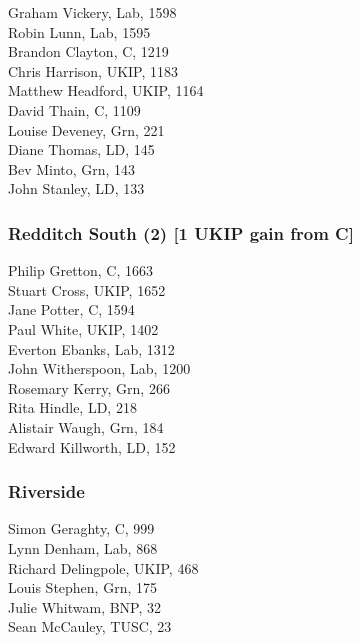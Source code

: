 \documentclass[a4paper,openany,10pt]{book}
\begin{document}


Graham Vickery, Lab, 1598\\
Robin Lunn, Lab, 1595\\
Brandon Clayton, C, 1219\\
Chris Harrison, UKIP, 1183\\
Matthew Headford, UKIP, 1164\\
David Thain, C, 1109\\
Louise Deveney, Grn, 221\\
Diane Thomas, LD, 145\\
Bev Minto, Grn, 143\\
John Stanley, LD, 133\\


\subsubsection*{Redditch South (2) \hspace*{\fill}\nolinebreak[1]%
\enspace\hspace*{\fill}
[1 UKIP gain from C]}



Philip Gretton, C, 1663\\
Stuart Cross, UKIP, 1652\\
Jane Potter, C, 1594\\
Paul White, UKIP, 1402\\
Everton Ebanks, Lab, 1312\\
John Witherspoon, Lab, 1200\\
Rosemary Kerry, Grn, 266\\
Rita Hindle, LD, 218\\
Alistair Waugh, Grn, 184\\
Edward Killworth, LD, 152\\


\subsubsection*{Riverside}



Simon Geraghty, C, 999\\
Lynn Denham, Lab, 868\\
Richard Delingpole, UKIP, 468\\
Louis Stephen, Grn, 175\\
Julie Whitwam, BNP, 32\\
Sean McCauley, TUSC, 23\\
\end{document}
